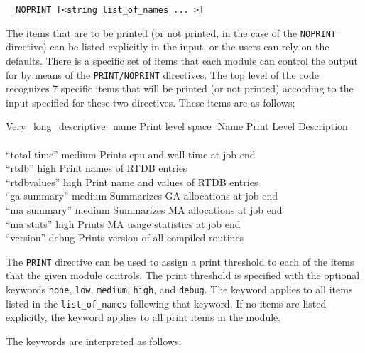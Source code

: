 \begin{verbatim}
  NOPRINT [<string list_of_names ... >]
\end{verbatim}

The items that are to be printed (or not printed, in the case of the
\verb+NOPRINT+ directive) can be listed explicitly in the input, or the
users can rely on the defaults.  There
is a specific set of items that each module can control the output for
by means of the \verb+PRINT/NOPRINT+ directives.
The top level of the code recognizes 7 specific items that will be printed
(or not printed) according to the input specified for these two directives.
These items are as follows;
\begin{tabbing}
  Very\_long\_descriptive\_name \= Print level space \= \kill
  Name                   \> Print Level \> Description \\
                         \>        \> \\
 ``total time''        \> medium \> Prints cpu and wall time at job end\\
 ``rtdb''              \> high    \> Print names of RTDB entries\\
 ``rtdbvalues''        \> high    \> Print name and values of RTDB entries\\
 ``ga summary''        \> medium \> Summarizes GA allocations at job end \\
 ``ma summary''        \> medium \> Summarizes MA allocations at job end \\
 ``ma stats''          \> high   \> Prints MA usage statistics at job end \\
 ``version''           \> debug  \> Prints version of all compiled routines \\
\end{tabbing}

The \verb+PRINT+ directive can be used to assign a print threshold to
each of the items that the given module controls.  The print threshold is
specified with the optional keywords \verb+none+, \verb+low+, \verb+medium+,
\verb+high+, and \verb+debug+.  The keyword applies to all items listed
in the \verb+list_of_names+ following that keyword.  If no items are listed
explicitly, the keyword applies to all print items in the module.

The keywords are interpreted as follows;

